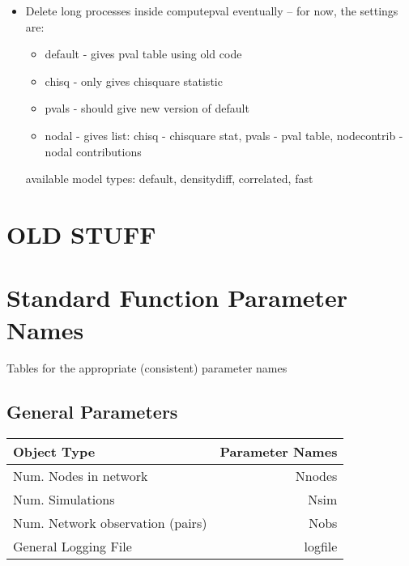\documentclass[11pt]{article}
\begin{document}
\begin{itemize}
\item Delete long processes inside computepval eventually -- for now, the settings are: 
\begin{itemize}
\item default - gives pval table using old code
\item chisq - only gives chisquare statistic
\item pvals - should give new version of default
\item nodal - gives list: chisq - chisquare stat, pvals - pval table, nodecontrib - nodal contributions
\end{itemize}
available model types: default, densitydiff, correlated, fast
\end{itemize}









\pagebreak

\section{OLD STUFF} 
\section{Standard Function Parameter Names}
Tables for the appropriate (consistent) parameter names









\subsection{General Parameters}
\begin{tabular}{|l|r|}
\hline
{\bf Object Type} & {\bf Parameter Names} \\


\hline
Num. Nodes in network & Nnodes \\

\hline
Num. Simulations & Nsim \\

\hline
Num. Network observation (pairs) & Nobs \\

\hline 
General Logging File	 & logfile \\

\hline
\end{tabular}
\end{document}

